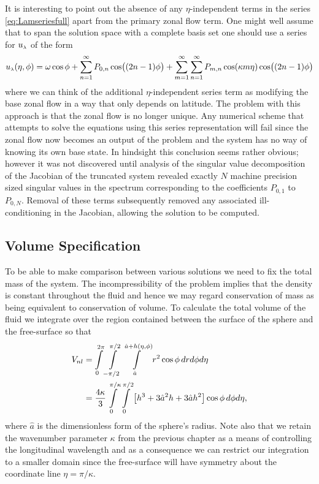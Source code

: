 It is interesting to point out the absence of any $\eta$-independent terms in the series \eqref{eq:Lamseriesfull} apart from the primary zonal flow term. One might well assume that to span the solution space with a complete basis set one should use a series for ${u_{\scriptscriptstyle \lambda}}$ of the form
\begin{equation*}
{\ensuremath{u_{\scriptscriptstyle \lambda}}}(\eta,\phi) = \omega\cos\phi+\sum_{n=1}^\infty P_{0,n} \cos\bigl((2n-1)\phi\bigr)+\sum_{m=1}^\infty \sum_{n=1}^\infty P_{m,n}\cos(\kappa m \eta) \cos\bigl((2n-1)\phi\bigr)
\end{equation*}
where we can think of the additional $\eta$-independent series term as modifying the base zonal flow in a way that only depends on latitude. The problem with this approach is that the zonal flow is no longer unique.  Any numerical scheme that attempts to solve the equations using this series representation will fail since the zonal flow now becomes an output of the problem and the system has no way of knowing its own base state. In hindsight this conclusion seems rather obvious; however it was not discovered until analysis of the singular value decomposition of the Jacobian of the truncated system revealed exactly $N$ machine precision sized singular values in the spectrum corresponding to the coefficients $P_{0,1}$ to $P_{0,N}$. Removal of these terms subsequently removed any associated ill-conditioning in the Jacobian, allowing the solution to be computed.

\subsection{Volume Specification} 
To be able to make comparison between various solutions we need to fix the total mass of the system. The incompressibility of the problem implies that the density is constant throughout the fluid and hence we may regard conservation of mass as being equivalent to conservation of volume. To calculate the total volume of the fluid we integrate over the region contained between the surface of the sphere and the free-surface so that
\begin{align}
V_{nl}&=\int\limits_0^{2\pi} \int\limits_{-\pi/2}^{\pi/2} \int\limits_{\hat{a}}^{\hat{a}+h(\eta,\phi)} r^2 \cos\phi\,dr d\phi d\eta \notag  \\
&=\frac{4\kappa}{3} \int\limits_0^{\pi/\kappa} \int\limits_0^{\pi/2} \left[ h^3 +3\hat{a}^2h+3\hat{a}h^2  \right]\cos\phi \,d\phi d\eta, \label{eq:volnl}
\end{align}
where $\hat{a}$ is the dimensionless form of the sphere's radius. Note also that we retain the wavenumber parameter $\kappa$ from the previous chapter as a means of controlling the longitudinal wavelength and as a consequence we can restrict our integration to a smaller domain since the free-surface will have symmetry about the coordinate line $\eta =\pi/\kappa$.

